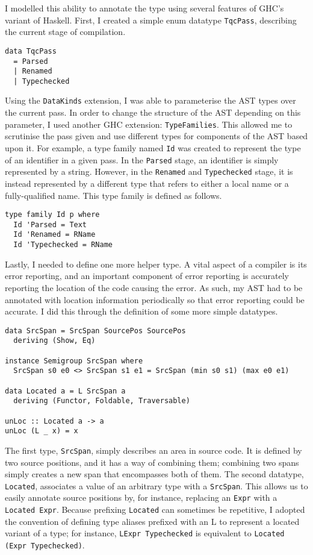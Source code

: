 \documentclass[9pt]{extarticle}
\begin{document}
I modelled this ability to annotate the type using several features of
GHC's variant of Haskell. First, I created a simple enum datatype
\verb'TqcPass', describing the current stage of compilation.

\begin{verbatim}
data TqcPass
  = Parsed
  | Renamed
  | Typechecked
\end{verbatim}

Using the \verb'DataKinds' extension, I was able to parameterise the AST
types over the current pass. In order to change the structure of the AST
depending on this parameter, I used another GHC extension:
\verb'TypeFamilies'. This allowed me to scrutinise the pass given and
use different types for components of the AST based upon it. For
example, a type family named \verb'Id' was created to represent the type
of an identifier in a given pass. In the \verb'Parsed' stage, an
identifier is simply represented by a string. However, in the
\verb'Renamed' and \verb'Typechecked' stage, it is instead represented
by a different type that refers to either a local name or a
fully-qualified name. This type family is defined as follows.

\begin{verbatim}
type family Id p where
  Id 'Parsed = Text
  Id 'Renamed = RName
  Id 'Typechecked = RName
\end{verbatim}

Lastly, I needed to define one more helper type. A vital aspect of a
compiler is its error reporting, and an important component of error
reporting is accurately reporting the location of the code causing the
error. As such, my AST had to be annotated with location information
periodically so that error reporting could be accurate. I did this
through the definition of some more simple datatypes.

\begin{verbatim}
data SrcSpan = SrcSpan SourcePos SourcePos
  deriving (Show, Eq)

instance Semigroup SrcSpan where
  SrcSpan s0 e0 <> SrcSpan s1 e1 = SrcSpan (min s0 s1) (max e0 e1)

data Located a = L SrcSpan a
  deriving (Functor, Foldable, Traversable)

unLoc :: Located a -> a
unLoc (L _ x) = x
\end{verbatim}

The first type, \verb'SrcSpan', simply describes an area in source code.
It is defined by two source positions, and it has a way of combining
them; combining two spans simply creates a new span that encompasses
both of them. The second datatype, \verb'Located', associates a value of
an arbitrary type with a \verb'SrcSpan'. This allows us to easily
annotate source positions by, for instance, replacing an \verb'Expr'
with a \verb'Located Expr'. Because prefixing \verb'Located' can
sometimes be repetitive, I adopted the convention of defining type
aliases prefixed with an L to represent a located variant of a type; for
instance, \verb'LExpr Typechecked' is equivalent to
\verb'Located (Expr Typechecked)'.
\end{document}
